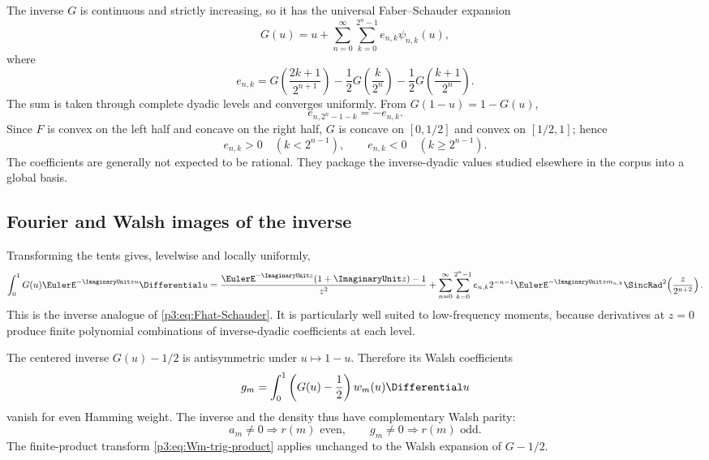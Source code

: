 \documentclass[11pt]{article}
\theoremstyle{definition}
\theoremstyle{remark}
\begin{document}
The inverse $G$ is continuous and strictly increasing, so it has the universal
Faber--Schauder expansion
\begin{equation}\label{p3:eq:G-Schauder}
 G(u)=u+\sum_{n=0}^\infty\sum_{k=0}^{2^n-1}
 e_{n,k}\psi_{n,k}(u),
\end{equation}
where
\begin{equation}\label{p3:eq:e-inverse-Schauder}
 e_{n,k}=G\!\left(\frac{2k+1}{2^{n+1}}\right)
 -\frac12G\!\left(\frac{k}{2^n}\right)
 -\frac12G\!\left(\frac{k+1}{2^n}\right).
\end{equation}
The sum is taken through complete dyadic levels and converges uniformly.  From
$G(1-u)=1-G(u)$,
\begin{equation}\label{p3:eq:e-inverse-antisymmetry}
 e_{n,2^n-1-k}=-e_{n,k}.
\end{equation}
Since $F$ is convex on the left half and concave on the right half, $G$ is
concave on $[0,1/2]$ and convex on $[1/2,1]$; hence
\begin{equation}\label{p3:eq:e-inverse-sign}
 e_{n,k}>0\quad(k<2^{n-1}),
 \qquad
 e_{n,k}<0\quad(k\ge2^{n-1}).
\end{equation}
The coefficients are generally not expected to be rational.  They package the
inverse-dyadic values studied elsewhere in the corpus into a global basis.

\subsection{Fourier and Walsh images of the inverse}

Transforming the tents gives, levelwise and locally uniformly,
\begin{equation}\label{p3:eq:Ghat-Schauder}
 \int_0^1G(u)\EulerE^{-\ImaginaryUnit zu}\Differential u
 =\frac{\EulerE^{-\ImaginaryUnit z}(1+\ImaginaryUnit z)-1}{z^2}
 +\sum_{n=0}^\infty\sum_{k=0}^{2^n-1}
 e_{n,k}2^{-n-1}\EulerE^{-\ImaginaryUnit zm_{n,k}}
 \SincRad^2\!\left(\frac{z}{2^{n+2}}\right).
\end{equation}
This is the inverse analogue of \eqref{p3:eq:Fhat-Schauder}.  It is particularly
well suited to low-frequency moments, because derivatives at $z=0$ produce
finite polynomial combinations of inverse-dyadic coefficients at each level.

The centered inverse $G(u)-1/2$ is antisymmetric under $u\mapsto1-u$.
Therefore its Walsh coefficients
\begin{equation}\label{p3:eq:G-Walsh-coeff}
 g_m=\int_0^1\left(G(u)-\frac12\right)w_m(u)\Differential u
\end{equation}
vanish for even Hamming weight.  The inverse and the density thus have
complementary Walsh parity:
\begin{equation}\label{p3:eq:complementary-Walsh-parity}
 a_m\ne0\Rightarrow r(m)\text{ even},
 \qquad
 g_m\ne0\Rightarrow r(m)\text{ odd}.
\end{equation}
The finite-product transform \eqref{p3:eq:Wm-trig-product} applies unchanged to
the Walsh expansion of $G-1/2$.
\end{document}
